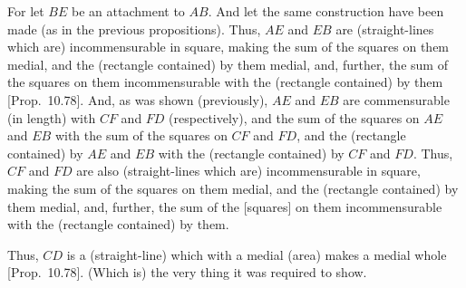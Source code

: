 \begin{Parallel}{}{}
{For let $BE$ be an attachment to $AB$. And let the same
construction have been made (as in the previous propositions). Thus,
$AE$ and $EB$ are (straight-lines which are) incommensurable in square, making
the sum of the squares on them medial, and the (rectangle contained)
by them medial, and, further, the sum of the squares on them incommensurable with the (rectangle contained) by them [Prop.~10.78].  And, as was shown (previously),
$AE$ and $EB$ are commensurable (in length) with $CF$ and $FD$ (respectively),
and the sum of the squares on $AE$ and $EB$ with the sum of the squares on
$CF$ and $FD$, and the (rectangle contained) by $AE$ and $EB$ with
the (rectangle contained) by $CF$ and $FD$. Thus, $CF$ and
$FD$ are also (straight-lines which are) incommensurable in square, making the sum of the squares on
them medial, and the (rectangle contained) by them medial, and, further,
the sum of the [squares] on them incommensurable with the (rectangle
contained) by them.

Thus, $CD$ is a (straight-line) which with a medial (area) makes a medial
whole [Prop.~10.78]. (Which is) the very thing
it was required to show.}
\end{Parallel}


